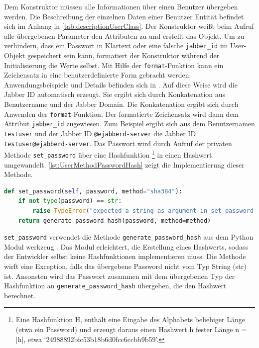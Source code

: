 \documentclass[a4paper,titlepage,halfparskip,12pt]{scrreprt}
\begin{document}
\begin{onehalfspacing}
Dem Konstruktor müssen alle Informationen über einen Benutzer übergeben werden. Die Beschreibung der einzelnen Daten einer Benutzer Entität befindet sich im Anhang in \autoref{tab:descriptionUserClass}. Der Konstruktor weißt beim Aufruf alle übergebenen Parameter den Attributen zu und erstellt das Objekt. Um zu verhindern, dass ein Passwort in Klartext oder eine falsche \texttt{jabber\_id} im User-Objekt gespeichert sein kann, formatiert der Konstruktor während der Initialisierung die Werte selbst. Mit Hilfe der \texttt{format}-Funktion kann ein Zeichensatz in eine benutzerdefinierte Form gebracht werden. Anwendungsbeispiele und Details befinden sich in \cite{pythonFormat}. Auf diese Weise wird die Jabber ID automatisch erzeugt. Sie ergibt sich durch Konkatenation aus Benutzername und der Jabber Domain. Die Konkatenation ergibt sich durch Anwenden der \texttt{format}-Funktion. Der formatierte Zeichensatz wird dann dem Attribut \texttt{jabber\_id} zugewiesen. Zum Beispiel ergibt sich aus dem Benutzernamen \texttt{testuser} und der Jabber ID \texttt{@ejabberd-server} die Jabber ID \texttt{testuser@ejabberd-server}. Das Passwort wird durch Aufruf der privaten Methode \texttt{set\_password} über eine Hashfunktion \footnote{Eine Hashfunktion H, enthält eine Eingabe des Alphabets beliebiger Länge (etwa ein Password) und erzeugt daraus einen Hashwert h fester Länge n = |h|, etwa ‘24988892bfc53b18b6d0fcc6ccbb9b59’.\cite{wendzel2018}} in einen Hashwert umgewandelt. \autoref{lst:UserMethodPasswordHash} zeigt die Implementierung dieser Methode.

\pagebreak

\begin{lstlisting}[language=python, caption={Methode zur Berechnung des Password Hashes}, label={lst:UserMethodPasswordHash}]
def set_password(self, password, method="sha384"):
    if not type(password) == str:
        raise TypeError("expected a string as argument in set_password function.")
    return generate_password_hash(password, method=method)
\end{lstlisting}

\texttt{set\_password} verwendet die Methode \texttt{generate\_password\_hash} aus dem Python Modul werkzeug \cite{werkzeugDoc}. Das Modul erleichtert, die Erstellung eines Hashwerts, sodass der Entwickler selbst keine Hashfunktionen implementieren muss. Die Methode wirft eine Exception, falls das übergebene Password nicht vom Typ String (str) ist. Ansonsten wird das Passwort zusammen mit dem übergebenen Typ der Hashfunktion an \texttt{generate\_password\_hash} übergeben, die den Hashwert berechnet.


\end{onehalfspacing}
\end{document}
